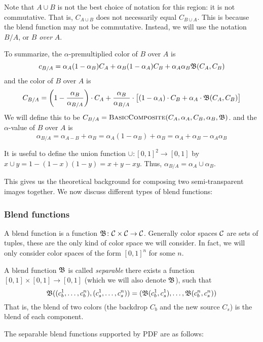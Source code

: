 Note that $A\cup B$ is not the best choice of notation for this region: it is not commutative.
That is, $C_{A\cup B}$ does not necessarily equal $C_{B\cup A}$.
This is because the blend function may not be commutative.
Instead, we will use the notation $B/A$, or $B$ {\it over} $A$.

To summarize, the $\alpha$-premultiplied color of $B$ over $A$ is
$$ c_{B/A} = \alpha_A(1-\alpha_B)C_A + \alpha_B(1-\alpha_A)C_B + \alpha_A\alpha_B{\frak B}(C_A,C_B) $$
and the color of $B$ over $A$ is
$$ C_{B/A} = \left(1-{{\alpha_B}\over{\alpha_{B/A}}}\right)\cdot C_A +
{{\alpha_B}\over{\alpha_{B/A}}}\cdot\bigl[(1-\alpha_A)\cdot C_B+\alpha_A\cdot{\frak B}(C_A,C_B)\bigr] $$
We will define this to be $C_{B/A}=\hbox{\sc BasicComposite}(C_A,\alpha_A,C_B,\alpha_B,{\frak B})$.
and the $\alpha$-value of $B$ over $A$ is
$$ \alpha_{B/A} = \alpha_{A-B} + \alpha_{B} = \alpha_A(1-\alpha_B) + \alpha_B =
\alpha_A + \alpha_B - \alpha_A\alpha_B $$

It is useful to define the union function ${\cup}\colon[0,1]^2\to[0,1]$ by
$x\cup y=1-(1-x)(1-y)=x+y-xy$.
Thus, $\alpha_{B/A}=\alpha_A\cup\alpha_B$.

This gives us the theoretical background for composing two semi-transparent images together.
We now discuss different types of blend functions:

\subsubsection{Blend functions}

A blend function is a function ${\frak B}\colon{\cal C}\times{\cal C}\to{\cal C}$.
Generally color spaces ${\cal C}$ are sets of tuples, these are the only kind of color space we will consider.
In fact, we will only consider color spaces of the form $[0,1]^n$ for some $n$.

A blend function ${\frak B}$ is called {\it separable} there exists a function $[0,1]\times[0,1]\to[0,1]$ (which we
will also denote ${\frak B}$), such that
$$ {\frak B}((c_b^1,\dots,c_b^n),(c_s^1,\dots,c_s^n))=({\frak B}(c_b^1,c_s^1),\dots,{\frak B}(c_b^n,c_s^n)) $$
That is, the blend of two colors (the backdrop $C_b$ and the new source $C_s$) is the blend of each
component.

The separable blend functions supported by PDF are as follows:

